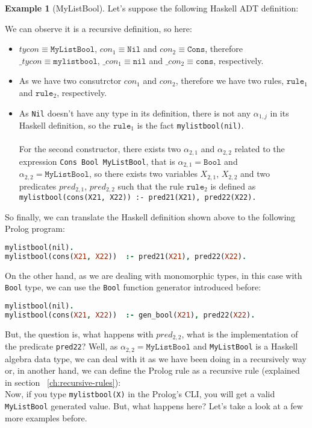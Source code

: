 \documentclass{report}
\theoremstyle{definition}
\newtheorem{example}{Example}[section]
\theoremstyle{definition}
\newcommand{\ttt}[1]{\texttt{#1}}
\begin{document}
\begin{example}[MyListBool]
	Let's suppose the following Haskell ADT definition:
	
	We can observe it is a recursive definition, so here:
	\begin{itemize}
		\item $tycon \equiv \ttt{MyListBool}$, $con_1 \equiv \ttt{Nil}$ and $con_2 \equiv \ttt{Cons}$, therefore $\_tycon \equiv \ttt{mylistbool}$, $\_con_1 \equiv \ttt{nil}$ and $\_con_2 \equiv \ttt{cons}$, respectively.
		\item As we have two consutrctor $con_1$ and $con_2$, therefore we have two rules, $\ttt{rule}_1$ and $\ttt{rule}_2$, respectively.
		\item As \ttt{Nil} doesn't have any type in its definition, there is not any $\alpha_{1,j}$ in its Haskell definition, so the $\ttt{rule}_1$ is the fact \ttt{mylistbool(nil)}.\\\\
		      For the second constructor, there exists two $\alpha_{2,1}$ and $\alpha_{2,2}$ related to the expression \ttt{Cons Bool MyListBool}, that is $\alpha_{2,1} = \ttt{Bool}$ and $\alpha_{2,2} = \ttt{MyListBool}$, so there exists two variables $X_{2,1}$, $X_{2,2}$ and two predicates $pred_{2,1}$, $pred_{2,2}$ such that the rule $\ttt{rule}_2$ is defined as \\ \ttt{mylistbool(cons(X21, X22)) :- pred21(X21), pred22(X22).}
	\end{itemize}
	So finally, we can translate the Haskell definition shown above to the following Prolog program:\\
	\begin{lstlisting}[language=Prolog]
mylistbool(nil).																										%% rule 1
mylistbool(cons(X21, X22)) 	:- pred21(X21), pred22(X22).						%% rule 2
	\end{lstlisting}
	On the other hand, as we are dealing with monomorphic types, in this case with \ttt{Bool} type, we can use the \ttt{Bool} function generator introduced before:\\
	\begin{lstlisting}[language=Prolog]
mylistbool(nil).																										%% rule 1
mylistbool(cons(X21, X22)) 	:- gen_bool(X21), pred22(X22).					%% rule 2
	\end{lstlisting}
	But, the question is, what happens with $pred_{2,2}$, what is the implementation of the predicate \ttt{pred22}? Well, as $\alpha_{2,2} = \ttt{MyListBool}$ and \ttt{MyListBool} is a Haskell algebra data type, we can deal with it as we have been doing in a recursively way or, in another hand, we can define the Prolog rule as a recursive rule (explained in section ~\ref{ch:recursive-rules}):\\
	
	Now, if you type \ttt{mylistbool(X)} in the Prolog's CLI, you will get a valid \ttt{MyListBool} generated value. But, what happens here? Let's take a look at a few more examples before.\\
\end{example}
\end{document}
